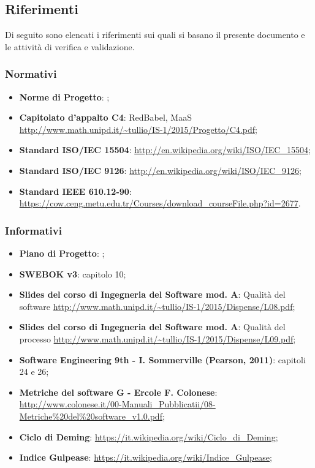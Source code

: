 \subsection{Riferimenti}
Di seguito  sono elencati i riferimenti sui quali si basano il presente documento e le attività di verifica e validazione.

\subsubsection{Normativi}
\begin{itemize}
\item \textbf{Norme di Progetto}: \NormeDiProgetto;
\item \textbf{Capitolato d'appalto C4}: RedBabel, MaaS \url{http://www.math.unipd.it/~tullio/IS-1/2015/Progetto/C4.pdf};
\item \textbf{Standard ISO/IEC 15504}: \url{http://en.wikipedia.org/wiki/ISO/IEC_15504};
\item \textbf{Standard ISO/IEC 9126}: \url{http://en.wikipedia.org/wiki/ISO/IEC_9126};
\item \textbf{Standard IEEE 610.12-90}: \url{https://cow.ceng.metu.edu.tr/Courses/download_courseFile.php?id=2677}.
\end{itemize}
	
\subsubsection{Informativi}
\begin{itemize}
\item \textbf{Piano di Progetto}: \PianoDiProgetto;
\item \textbf{SWEBOK v3}: capitolo 10;
\item \textbf{Slides del corso di Ingegneria del Software mod. A}: Qualità del software \url{http://www.math.unipd.it/~tullio/IS-1/2015/Dispense/L08.pdf};
\item \textbf{Slides del corso di Ingegneria del Software mod. A}: Qualità del processo \url{http://www.math.unipd.it/~tullio/IS-1/2015/Dispense/L09.pdf};
\item \textbf{Software Engineering 9th - I. Sommerville (Pearson, 2011)}: capitoli 24 e 26;
\item \textbf{Metriche del software G - Ercole F. Colonese}: \url{http://www.colonese.it/00-Manuali_Pubblicatii/08-Metriche%20del%20software_v1.0.pdf};
\item \textbf{Ciclo di Deming}: \url{https://it.wikipedia.org/wiki/Ciclo_di_Deming};
\item \textbf{Indice Gulpease}: \url{https://it.wikipedia.org/wiki/Indice_Gulpease};
\end{itemize}
